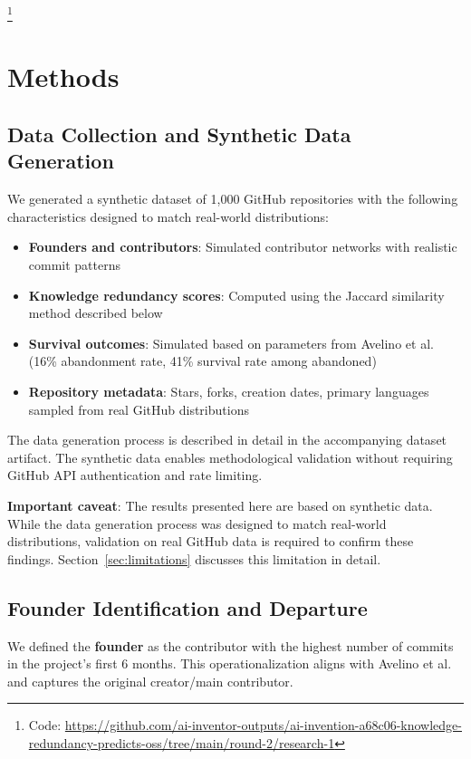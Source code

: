 \documentclass[11pt,letterpaper]{article}
\begin{document}
\footnote{Code: \url{https://github.com/ai-inventor-outputs/ai-invention-a68c06-knowledge-redundancy-predicts-oss/tree/main/round-2/research-1}}

\section{Methods}

\subsection{Data Collection and Synthetic Data Generation}

We generated a synthetic dataset of 1,000 GitHub repositories with the following characteristics designed to match real-world distributions:

\begin{itemize}
    \item \textbf{Founders and contributors}: Simulated contributor networks with realistic commit patterns
    \item \textbf{Knowledge redundancy scores}: Computed using the Jaccard similarity method described below
    \item \textbf{Survival outcomes}: Simulated based on parameters from Avelino et al. \cite{Avelino2019} (16\% abandonment rate, 41\% survival rate among abandoned)
    \item \textbf{Repository metadata}: Stars, forks, creation dates, primary languages sampled from real GitHub distributions
\end{itemize}

The data generation process is described in detail in the accompanying dataset artifact. The synthetic data enables methodological validation without requiring GitHub API authentication and rate limiting.

\textbf{Important caveat}: The results presented here are based on synthetic data. While the data generation process was designed to match real-world distributions, validation on real GitHub data is required to confirm these findings. Section~\ref{sec:limitations} discusses this limitation in detail.

\subsection{Founder Identification and Departure}

We defined the \textbf{founder} as the contributor with the highest number of commits in the project's first 6 months. This operationalization aligns with Avelino et al. \cite{Avelino2019} and captures the original creator/main contributor.
\end{document}
